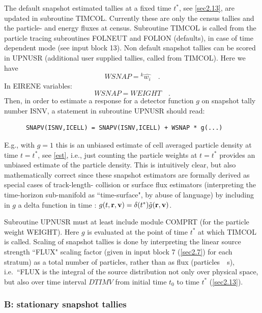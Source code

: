 The default snapshot estimated tallies at a fixed time $t^*$, see
\cref{sec2.13}, are updated in subroutine TIMCOL.
Currently these are only the census tallies and the particle- and energy fluxes
at census.
Subroutine TIMCOL is called from the particle tracing subroutines FOLNEUT and
FOLION (defaults), in case of time dependent mode (see input block 13).
Non default snapshot tallies can be scored in UPNUSR (additional user supplied
tallies, called from TIMCOL).
Here we have
\begin{displaymath}
  WSNAP = {^k{\hat{w_i}}}   \quad .
\end{displaymath}
In EIRENE variables:
\begin{displaymath}
  WSNAP = WEIGHT	\quad .
\end{displaymath}
Then, in order to estimate a response for a detector function $g$ on snapshot
tally number ISNV, a statement in subroutine UPNUSR should read:

\begin{lstlisting}
      SNAPV(ISNV,ICELL) = SNAPV(ISNV,ICELL) + WSNAP * g(...)
\end{lstlisting}

E.g., with $g=1$ this is an unbiased estimate of cell averaged particle density
at time $t=t^*$, see \cref{est}, i.e., just counting the particle weights at
$t=t^*$ provides an unbiased estimate of the particle density.
This is intuitively clear, but also mathematically correct since these snapshot
estimators are formally derived as special cases of track-length- collision or
surface flux estimators (interpreting the time-horizon sub-manifold as
``time-surface", by abuse of language) by including in $g$ a delta function in
time : $g(t,\mathbf{r},\mathbf{v})=\delta(t^*)\tilde g(\mathbf{r},\mathbf{v})$.

Subroutine UPNUSR must at least include module COMPRT (for the particle weight
WEIGHT).
Here $g$ is evaluated at the point of time $t^*$ at which TIMCOL is called.
Scaling of snapshot tallies is done by interpreting the linear source strength
``FLUX" scaling factor (given in input block 7 (\cref{sec2.7}) for each
stratum) as a total number of particles, rather than as flux
(particles~\si{\per\second}), i.e.\ ``FLUX is the integral of the source
distribution not only over physical space, but also over time interval $DTIMV$
from initial time $t_0$ to time $t^*$ (\cref{sec2.13}).

\subsubsection{B: stationary snapshot tallies}\label{sec3.2.3b}

